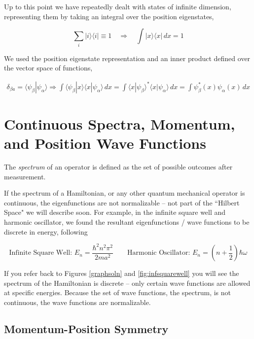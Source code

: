 Up to this point we have repeatedly dealt with states of infinite dimension,
representing them by taking an integral over the position eigenstates, 

\[
\sum_{i}^{} |i\rangle \langle i | \equiv 1 \quad \Rightarrow \quad \int
|x\rangle \langle x | \, dx = 1
\] \vspace{3px}

We used the position eigenstate representation and an inner
product defined over the vector space of functions, 

\begin{align*}
  \delta_{\beta a} = \langle \psi_\beta | \psi_\alpha \rangle \Rightarrow \int
  \langle \psi_\beta | x \rangle \langle x | \psi_\alpha \rangle \, dx = \int
  \langle x|\psi_\beta\rangle^* \langle x | \psi_\alpha \rangle \, dx = \int
  \psi_\beta^* (x) \psi_\alpha (x) \, dx 
\end{align*} \vspace{3px}


\section{Continuous Spectra, Momentum, and Position Wave Functions}

The \textit{spectrum} of an operator is defined as the set of possible outcomes
after measurement. 

If the spectrum of a Hamiltonian, or any other quantum mechanical operator is
continuous, the eigenfunctions are not normalizable -- not part of the
``Hilbert Space" we will describe soon. For example, in the infinite square
well and harmonic oscillator, we found the resultant eigenfunctions / wave
functions to be discrete in energy, following 

\[
\text{Infinite Square Well: } E_n = \frac{\hbar^2n^2\pi^2}{2ma^2} \qquad
\text{Harmonic Oscillator: } E_n = \left( n + \frac{1}{2} \right) \hbar\omega   
\] \vspace{3px}

If you refer back to Figures \ref{graphsoln} and \ref{fig:infsquarewell} you
will see the spectrum of the Hamiltonian is discrete -- only certain wave
functions are allowed at specific energies. Because the set of wave functions,
the spectrum, is not continuous, the wave functions are normalizable. 

\subsection{Momentum-Position Symmetry} 


